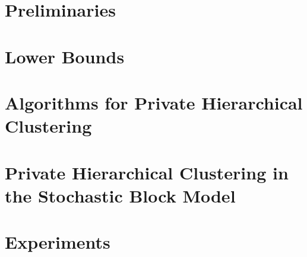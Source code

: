 \documentclass{article}
\begin{document}
\section{Preliminaries}\label{sec:preliminaries}


\section{Lower Bounds}\label{sec:lower-bounds}


\section{Algorithms for Private Hierarchical Clustering}\label{sec:algorithms}


\section{Private Hierarchical Clustering in the Stochastic Block Model}\label{sec:algorithms-hsbm}


\section{Experiments} \label{sec:experiments}




\appendix
\onecolumn

\end{document}
